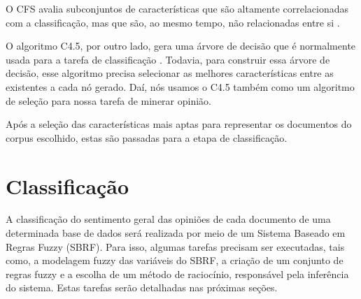 O CFS avalia subconjuntos de características que são altamente correlacionadas com a classificação, mas que são, ao mesmo tempo, não relacionadas entre si \cite{hall1999correlation}.  

O algoritmo C4.5, por outro lado, gera uma árvore de decisão que é normalmente usada para a tarefa de classificação \cite{quinlan19934}. Todavia, para construir essa árvore de decisão, esse algoritmo precisa selecionar as melhores características entre as existentes a cada nó gerado. Daí, nós usamos o C4.5 também como um algoritmo de seleção para nossa tarefa de minerar opinião. 

Após a seleção das características mais aptas para representar os documentos do corpus escolhido, estas são passadas para a etapa de classificação. 

\section{Classificação}


A classificação do sentimento geral das opiniões de cada documento de uma determinada base de dados será realizada por meio de um Sistema Baseado em Regras Fuzzy (SBRF). Para isso, algumas tarefas precisam ser executadas, tais como, a modelagem fuzzy das variáveis do SBRF, a criação de um conjunto de regras fuzzy e a escolha de um método de raciocínio, responsável pela inferência do sistema. Estas tarefas serão detalhadas nas próximas seções.

